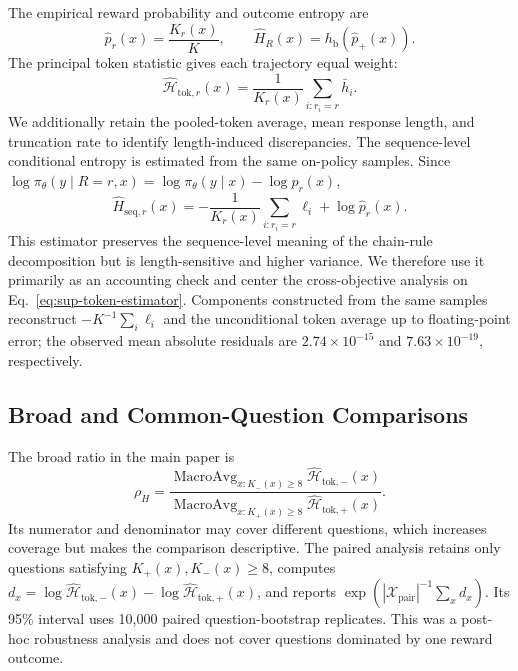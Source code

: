 \documentclass[letterpaper]{article}
\begin{document}
The empirical reward probability and outcome entropy are
\[
\widehat p_r(x)=\frac{K_r(x)}{K},
\qquad
\widehat H_R(x)=h_{\mathrm b}(\widehat p_+(x)).
\]
The principal token statistic gives each trajectory equal weight:
\begin{equation}
\widehat{\mathcal H}_{\mathrm{tok},r}(x)
=\frac{1}{K_r(x)}\sum_{i:r_i=r}\bar h_i.
\label{eq:sup-token-estimator}
\end{equation}
We additionally retain the pooled-token average, mean response length, and
truncation rate to identify length-induced discrepancies.  The
sequence-level conditional entropy is estimated from the same on-policy
samples.  Since
\(\log\pi_\theta(y\mid R=r,x)=
\log\pi_\theta(y\mid x)-\log p_r(x)\),
\begin{equation}
\widehat H_{\mathrm{seq},r}(x)
=-\frac{1}{K_r(x)}\sum_{i:r_i=r}\ell_i
+\log\widehat p_r(x).
\label{eq:sup-sequence-estimator}
\end{equation}
This estimator preserves the sequence-level meaning of the chain-rule
decomposition but is length-sensitive and higher variance.  We therefore use
it primarily as an accounting check and center the cross-objective analysis
on Eq.~\eqref{eq:sup-token-estimator}.  Components constructed from the same
samples reconstruct \(-K^{-1}\sum_i\ell_i\) and the unconditional token
average up to floating-point error; the observed mean absolute residuals are
\(2.74\times10^{-15}\) and \(7.63\times10^{-19}\), respectively.

\subsection{Broad and Common-Question Comparisons}

The broad ratio in the main paper is
\[
\rho_H=
\frac{\operatorname{MacroAvg}_{x:K_-(x)\geq8}
      \widehat{\mathcal H}_{\mathrm{tok},-}(x)}
     {\operatorname{MacroAvg}_{x:K_+(x)\geq8}
      \widehat{\mathcal H}_{\mathrm{tok},+}(x)}.
\]
Its numerator and denominator may cover different questions, which increases
coverage but makes the comparison descriptive.  The paired analysis retains
only questions satisfying \(K_+(x),K_-(x)\geq8\), computes
\(d_x=\log\widehat{\mathcal H}_{\mathrm{tok},-}(x)-
\log\widehat{\mathcal H}_{\mathrm{tok},+}(x)\), and reports
\(\exp(|\mathcal X_{\mathrm{pair}}|^{-1}\sum_x d_x)\).  Its 95\% interval
uses 10,000 paired question-bootstrap replicates.  This was a post-hoc
robustness analysis and does not cover questions dominated by one reward
outcome.
\end{document}
